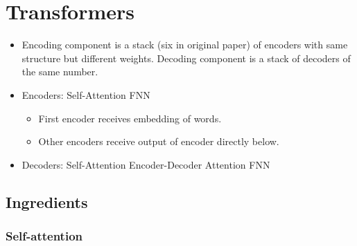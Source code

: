 \chapter{Transformers}

\begin{itemize}
\item 
Encoding component is a stack (six in original paper) of encoders with same structure but different weights. Decoding component is a stack of decoders of the same number.

\item 
Encoders: Self-Attention \textrightarrow{} FNN
	\begin{itemize}
	\item 
	First encoder receives embedding of words.
	
	\item 
	Other encoders receive output of encoder directly below.
	\end{itemize}

\item 
Decoders: Self-Attention \textrightarrow{} Encoder-Decoder Attention \textrightarrow{} FNN
\end{itemize}

\section{Ingredients}
\subsection{Self-attention}
